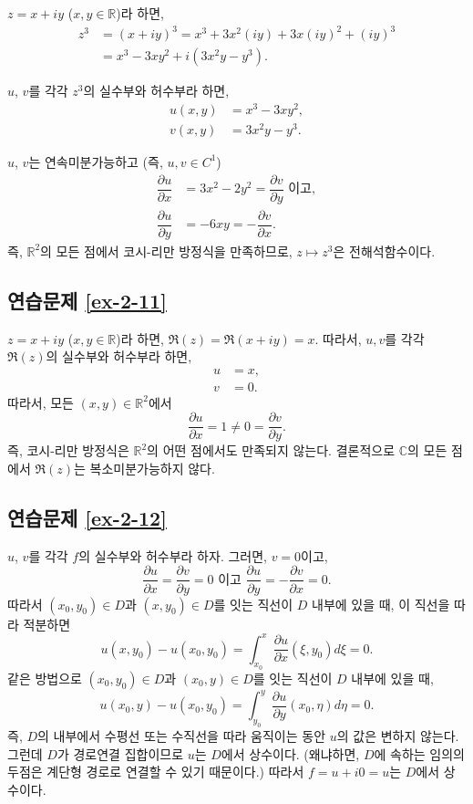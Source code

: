 $z = x+iy$ ($x,y\in\mathbb R$)라 하면,
\begin{align*}
z^3 &= (x+iy)^3 = x^3 + 3x^2(iy) + 3x(iy)^2 + (iy)^3 \\
&= x^3 - 3xy^2 + i(3x^2y-y^3).
\end{align*}

$u$, $v$를 각각 $z^3$의 실수부와 허수부라 하면,
\begin{align*}
u(x,y) &= x^3 -3xy^2, \\
v(x,y) &= 3x^2y - y^3.
\end{align*}

$u$, $v$는 연속미분가능하고 (즉, $u,v\in C^1$)
\begin{align*}
\dfrac{\partial u}{\partial x} &= 3x^2 -2y^2 = \dfrac{\partial v}{\partial y} \text{ 이고}, \\
\dfrac{\partial u}{\partial y} &= -6xy = - \dfrac{\partial v}{\partial x}.
\end{align*}
즉, $\mathbb R^2$의 모든 점에서 코시-리만 방정식을 만족하므로,
$z\mapsto z^3$은 전해석함수이다.

\subsection*{연습문제 \ref{ex-2-11}}

$z = x+iy$ ($x,y\in\mathbb R$)라 하면,
$\Re(z) = \Re(x+iy) = x$.
따라서, $u, v$를 각각 $\Re(z)$의 실수부와 허수부라 하면,
\begin{align*}
u & =x, \\
v &=0.
\end{align*}
따라서, 모든 $(x,y) \in \mathbb R^2$에서
\[
\dfrac{\partial u}{\partial x}  = 1 \ne 0 =  \dfrac{\partial v}{\partial y}.
\]
즉, 코시-리만 방정식은 $\mathbb R^2$의 어떤 점에서도 만족되지 않는다.
결론적으로 $\mathbb C$의 모든 점에서 $\Re(z)$는 복소미분가능하지 않다.

\subsection*{연습문제 \ref{ex-2-12}}

$u$, $v$를 각각 $f$의 실수부와 허수부라 하자. 
그러면, $v=0$이고,
\[
\dfrac{\partial u}{\partial x} = \dfrac{\partial v}{\partial y} = 0
\text{ 이고 }
\dfrac{\partial u}{\partial y} = - \dfrac{\partial v}{\partial x} = 0.
\]
따라서 $(x_0,y_0)\in D$과 $(x, y_0)\in D$를 잇는 직선이  $D$ 내부에 있을 때, 이 직선을 따라 적분하면
\[
u(x,y_0) - u(x_0,y_0) = \int_{x_0}^x \dfrac{\partial u}{\partial x}(\xi, y_0) d\xi = 0.
\]
같은 방법으로 
 $(x_0,y_0)\in D$과 $(x_0, y)\in D$를 잇는 직선이  $D$ 내부에 있을 때, 
\[
u(x_0,y) - u(x_0,y_0) = \int_{y_0}^y \dfrac{\partial u}{\partial y}(x_0, \eta) d\eta = 0.
\]
즉, $D$의 내부에서 수평선 또는 수직선을 따라 움직이는 동안 $u$의 값은 변하지 않는다.
그런데 $D$가 경로연결 집합이므로 $u$는 $D$에서 상수이다.
(왜냐하면, $D$에 속하는 임의의  두점은 계단형 경로로 연결할 수 있기 때문이다.)
따라서 $f=u+i0 = u$는 $D$에서 상수이다.

